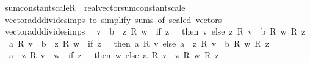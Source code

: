 \begin{isabellebody}
\endisatagproof
{\isafoldproof}%
%
\isadelimproof
\isanewline
%
\endisadelimproof
\isanewline
{}\isamarkupfalse%
\ sum{\isacharunderscore}{\kern0pt}constant{\isacharunderscore}{\kern0pt}scaleR\ {\isacharequal}{\kern0pt}\ real{\isacharunderscore}{\kern0pt}vector{\isachardot}{\kern0pt}sum{\isacharunderscore}{\kern0pt}constant{\isacharunderscore}{\kern0pt}scale%
\isanewline
\isanewline
{}\isamarkupfalse%
\ vector{\isacharunderscore}{\kern0pt}add{\isacharunderscore}{\kern0pt}divide{\isacharunderscore}{\kern0pt}simps\ {\isachardoublequoteopen}to\ simplify\ sums\ of\ scaled\ vectors{\isachardoublequoteclose}\isanewline
\isanewline
{}\isamarkupfalse%
\ {\isacharbrackleft}{\kern0pt}vector{\isacharunderscore}{\kern0pt}add{\isacharunderscore}{\kern0pt}divide{\isacharunderscore}{\kern0pt}simps{\isacharbrackright}{\kern0pt}{\isacharcolon}{\kern0pt}\isanewline
\ \ {\isachardoublequoteopen}v\ {\isacharplus}{\kern0pt}\ {\isacharparenleft}{\kern0pt}b\ {\isacharslash}{\kern0pt}\ z{\isacharparenright}{\kern0pt}\ {\isacharasterisk}{\kern0pt}\isactrlsub R\ w\ {\isacharequal}{\kern0pt}\ {\isacharparenleft}{\kern0pt}if\ z\ {\isacharequal}{\kern0pt}\ {}\ then\ v\ else\ {\isacharparenleft}{\kern0pt}z\ {\isacharasterisk}{\kern0pt}\isactrlsub R\ v\ {\isacharplus}{\kern0pt}\ b\ {\isacharasterisk}{\kern0pt}\isactrlsub R\ w{\isacharparenright}{\kern0pt}\ {\isacharslash}{\kern0pt}\isactrlsub R\ z{\isacharparenright}{\kern0pt}{\isachardoublequoteclose}\isanewline
\ \ {\isachardoublequoteopen}a\ {\isacharasterisk}{\kern0pt}\isactrlsub R\ v\ {\isacharplus}{\kern0pt}\ {\isacharparenleft}{\kern0pt}b\ {\isacharslash}{\kern0pt}\ z{\isacharparenright}{\kern0pt}\ {\isacharasterisk}{\kern0pt}\isactrlsub R\ w\ {\isacharequal}{\kern0pt}\ {\isacharparenleft}{\kern0pt}if\ z\ {\isacharequal}{\kern0pt}\ {}\ then\ a\ {\isacharasterisk}{\kern0pt}\isactrlsub R\ v\ else\ {\isacharparenleft}{\kern0pt}{\isacharparenleft}{\kern0pt}a\ {\isacharasterisk}{\kern0pt}\ z{\isacharparenright}{\kern0pt}\ {\isacharasterisk}{\kern0pt}\isactrlsub R\ v\ {\isacharplus}{\kern0pt}\ b\ {\isacharasterisk}{\kern0pt}\isactrlsub R\ w{\isacharparenright}{\kern0pt}\ {\isacharslash}{\kern0pt}\isactrlsub R\ z{\isacharparenright}{\kern0pt}{\isachardoublequoteclose}\isanewline
\ \ {\isachardoublequoteopen}{\isacharparenleft}{\kern0pt}a\ {\isacharslash}{\kern0pt}\ z{\isacharparenright}{\kern0pt}\ {\isacharasterisk}{\kern0pt}\isactrlsub R\ v\ {\isacharplus}{\kern0pt}\ w\ {\isacharequal}{\kern0pt}\ {\isacharparenleft}{\kern0pt}if\ z\ {\isacharequal}{\kern0pt}\ {}\ then\ w\ else\ {\isacharparenleft}{\kern0pt}a\ {\isacharasterisk}{\kern0pt}\isactrlsub R\ v\ {\isacharplus}{\kern0pt}\ z\ {\isacharasterisk}{\kern0pt}\isactrlsub R\ w{\isacharparenright}{\kern0pt}\ {\isacharslash}{\kern0pt}\isactrlsub R\ z{\isacharparenright}{\kern0pt}{\isachardoublequoteclose}\isanewline

\end{isabellebody}
